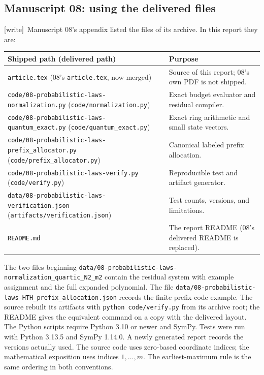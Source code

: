 \documentclass[11pt,letterpaper]{article}
\numberwithin{equation}{section}
\theoremstyle{definition}
\theoremstyle{remark}
\newcommand{\code}[1]{\nolinkurl{#1}}
\newcommand{\wtag}{\textup{[write]}}
\begin{document}
\subsection{Manuscript 08: using the delivered files}
\wtag\ Manuscript 08's appendix listed the files of its archive. In this
report they are:
\begin{center}
\small
\begin{tabular}{p{}p{}}
\toprule
Shipped path (delivered path) & Purpose\\
\midrule
\code{article.tex} (08's \code{article.tex}, now merged) & Source of this report; 08's own PDF is not shipped.\\
\code{code/08-probabilistic-laws-normalization.py} (\code{code/normalization.py}) & Exact budget evaluator and residual compiler.\\
\code{code/08-probabilistic-laws-quantum_exact.py} (\code{code/quantum_exact.py}) & Exact ring arithmetic and small state vectors.\\
\code{code/08-probabilistic-laws-prefix_allocator.py} (\code{code/prefix_allocator.py}) & Canonical labeled prefix allocation.\\
\code{code/08-probabilistic-laws-verify.py} (\code{code/verify.py}) & Reproducible test and artifact generator.\\
\code{data/08-probabilistic-laws-verification.json} (\code{artifacts/verification.json}) & Test counts, versions, and limitations.\\
\code{README.md} & The report README (08's delivered README is replaced).\\
\bottomrule
\end{tabular}
\end{center}
The two files beginning \code{data/08-probabilistic-laws-normalization_quartic_N2_m2}
contain the residual system with example assignment and the full expanded
polynomial. The file \code{data/08-probabilistic-laws-HTH_prefix_allocation.json}
records the finite prefix-code example. The source rebuilt its artifacts
with \texttt{python code/verify.py} from its archive root; the README gives the
equivalent command on a copy with the delivered layout.
The Python scripts require Python 3.10 or newer and SymPy. Tests were run
with Python 3.13.5 and SymPy 1.14.0. A newly generated report records the
versions actually used. The source code uses zero-based coordinate indices;
the mathematical exposition uses indices $1,\ldots,m$. The earliest-maximum
rule is the same ordering in both conventions.
\end{document}
